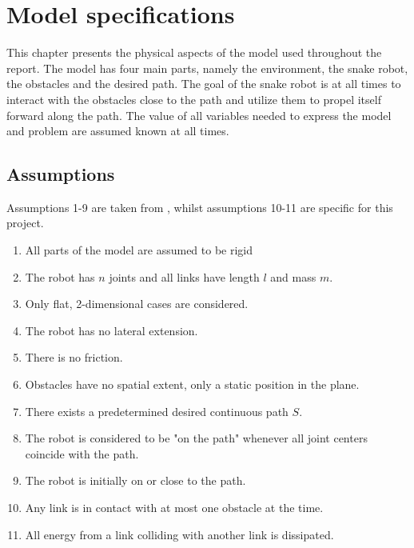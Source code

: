 \chapter{Model specifications} \label{ch:model_specs}

This chapter presents the physical aspects of the model used throughout the report. The model has four main parts, namely the environment, the snake robot, the obstacles and the desired path. The goal of the snake robot is at all times to interact with the obstacles close to the path and utilize them to propel itself forward along the path. The value of all variables needed to express the model and problem are assumed known at all times.

\section{Assumptions}\label{seq:assumptions}

Assumptions 1-9 are taken from \cite{StavdahlNote}, whilst assumptions 10-11 are specific for this project.

\begin{enumerate}
    \item All parts of the model are assumed to be rigid
    \item The robot has $n$ joints and all links have length $l$ and mass $m$.
    \item Only flat, 2-dimensional cases are considered.
    \item The robot has no lateral extension.
    \item There is no friction. 
    \item Obstacles have no spatial extent, only a static position in the plane.
    \item There exists a predetermined desired continuous path $S$.
    \item The robot is considered to be "on the path" whenever all joint centers coincide with the path.
    \item The robot is initially on or close to the path.
    \item Any link is in contact with at most one obstacle at the time.
    \item All energy from a link colliding with another link is dissipated.
\end{enumerate}

